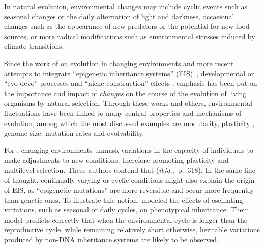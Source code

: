 In natural evolution, environmental changes may include cyclic events such as seasonal changes or the daily alternation of light and darkness, occasional changes such as the appearance of new predators or the potential for new food sources, or more radical modifications such as environmental stresses induced by climate transitions.

Since the work of \citet{levins1968evolution} on evolution in changing environments and more recent attempts to integrate ``epigenetic inheritance systems'' (EIS)~\citep{heard2014transgenerationalepigeneticinheritancemythsandmechanisms}, developmental or ``evo-devo'' processes \citep{muller2007evodevoextendingtheevolutionarysynthesis} and ``niche construction'' effects \citep{laland2016anintroductiontonicheconstructiontheory}, emphasis has been put on the importance and impact of \emph{changes} on the course of the evolution of living organisms by natural selection. Through these works and others, environmental fluctuations have been linked to many central properties and mechanisms of evolution, among which the most discussed examples are modularity, plasticity \citep{west2005developmental}, genome size, mutation rates and evolvability.

For \citet{jablonka2014evolution}, changing environments unmask variations in the capacity of individuals to make adjustments to new conditions, therefore promoting plasticity and multilevel selection. These authors contend that  (\emph{ibid.},~p.~318). In the same line of thought, continually varying or cyclic conditions might also explain the origin of EIS, as ``epigenetic mutations'' are more reversible and occur more frequently than genetic ones. To illustrate this notion, \citet{lachmann1996inheritance} modeled the effects of oscillating variations, such as seasonal or daily cycles, on phenotypical inheritance. Their model predicts correctly that when the environmental cycle is longer than the reproductive cycle, while remaining relatively short otherwise, heritable variations produced by non-DNA inheritance systems are likely to be observed. 


